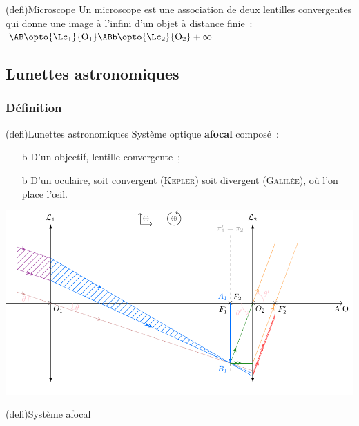 \documentclass[../../main/main.tex]{subfiles}
\begin{document}
\begin{tcb*}[label=defi:microscope, cnt, bld](defi){Microscope}
	Un microscope est une association de deux lentilles convergentes qui donne
	une image à l'infini d'un objet à distance finie~: $\AB \opto{\Lc_1}{\rm O_1}
		\ABb \opto{\Lc_2}{\rm O_2} +\infty$
\end{tcb*}

\subsection{Lunettes astronomiques}
\subsubsection{Définition}


\begin{tcb*}[sidebyside, righthand ratio=.6](defi){Lunettes astronomiques}
	Système optique \textbf{afocal} composé~:
	\begin{itemize}
		\item[b]{D'un objectif}\!\!, lentille convergente~;
		\item[b]{D'un oculaire}\!\!, soit convergent (\textsc{Kepler}) soit
		divergent
		(\textsc{Galilée}), où l'on place l'œil.
	\end{itemize}
	\tcblower
	\begin{center}
		\includegraphics[width=\linewidth]{kepler}
		\label{fig:kepler}
	\end{center}
\end{tcb*}

\begin{tcb*}(defi){Système afocal}
\end{tcb*}
\end{document}
